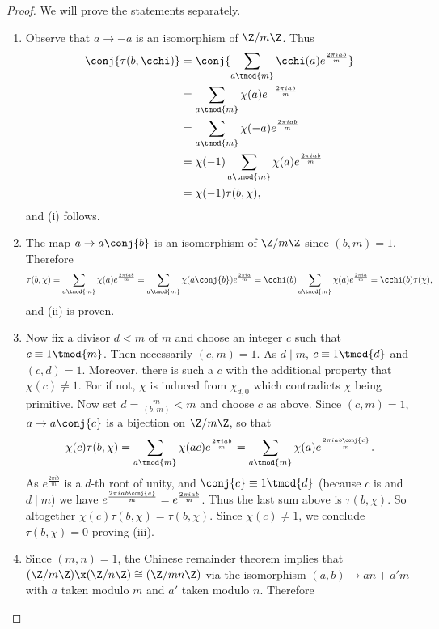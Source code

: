      \begin{proof}
        We will prove the statements separately.
        \begin{enumerate}[label=(\roman*)]
          \item Observe that $a \to -a$ is an isomorphism of $\Z/m\Z$. Thus
          \begin{align*}
            \conj{\tau(b,\cchi)} &= \conj{\sum_{a \tmod{m}}\cchi(a)e^{\frac{2\pi iab}{m}}} \\
            &= \sum_{a \tmod{m}}\chi(a)e^{-\frac{2\pi iab}{m}} \\
            &= \sum_{a \tmod{m}}\chi(-a)e^{\frac{2\pi iab}{m}} \\
            &= \chi(-1)\sum_{a \tmod{m}}\chi(a)e^{\frac{2\pi iab}{m}} \\
            &= \chi(-1)\tau(b,\chi),
          \end{align*}
          and (i) follows.
          \item The map $a \to a\conj{b}$ is an isomorphism of $\Z/m\Z$ since $(b,m) = 1$. Therefore
          \[
            \tau(b,\chi) = \sum_{a \tmod{m}}\chi(a)e^{\frac{2\pi iab}{m}} = \sum_{a \tmod{m}}\chi(a\conj{b})e^{\frac{2\pi ia}{m}} = \cchi(b)\sum_{a \tmod{m}}\chi(a)e^{\frac{2\pi ia}{m}} = \cchi(b)\tau(\chi),
          \]
          and (ii) is proven.
          \item Now fix a divisor $d < m$ of $m$ and choose an integer $c$ such that $c \equiv 1 \tmod{m}$. Then necessarily $(c,m) = 1$. As $d \mid m$, $c \equiv 1 \tmod{d}$ and $(c,d) = 1$. Moreover, there is such a $c$ with the additional property that $\chi(c) \neq 1$. For if not, $\chi$ is induced from $\chi_{d,0}$ which contradicts $\chi$ being primitive. Now set $d = \frac{m}{(b,m)} < m$ and choose $c$ as above. Since $(c,m) = 1$, $a \to a\conj{c}$ is a bijection on $\Z/m\Z$, so that
          \[
            \chi(c)\tau(b,\chi) = \sum_{a \tmod{m}}\chi(ac)e^{\frac{2\pi iab}{m}} = \sum_{a \tmod{m}}\chi(a)e^{\frac{2\pi iab\conj{c}}{m}}.
          \]
          As $e^{\frac{2\pi ib}{m}}$ is a $d$-th root of unity, and $\conj{c} \equiv 1 \tmod{d}$ (because $c$ is and $d \mid m$) we have $e^{\frac{2\pi iab\conj{c}}{m}} = e^{\frac{2\pi iab}{m}}$. Thus the last sum above is $\tau(b,\chi)$. So altogether $\chi(c)\tau(b,\chi) = \tau(b,\chi)$. Since $\chi(c) \neq 1$, we conclude $\tau(b,\chi) = 0$ proving (iii).
          \item Since $(m,n) = 1$, the Chinese remainder theorem implies that $(\Z/m\Z) \x (\Z/n\Z) \cong (\Z/mn\Z)$ via the isomorphism $(a,b) \to an+a'm$ with $a$ taken modulo $m$ and $a'$ taken modulo $n$. Therefore

\end{enumerate}
\end{proof}
